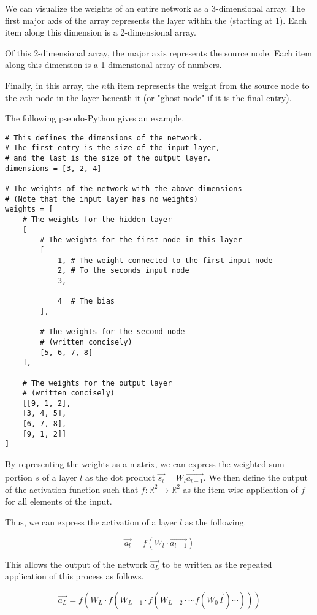 \documentclass[8pt]{amsart}
\begin{document}
We can visualize the weights of an entire network as a 3-dimensional array. The first
major axis of the array represents the layer within the  (starting at 1). Each item
along this dimension is a 2-dimensional array.

Of this 2-dimensional array, the major axis represents the source node. Each item
along this dimension is a 1-dimensional array of numbers.

Finally, in this array, the $n$th item represents the weight from the source node
to the $n$th node in the layer beneath it (or "ghost node" if it is the final entry).

The following pseudo-Python gives an example.

\begin{verbatim}
# This defines the dimensions of the network.
# The first entry is the size of the input layer,
# and the last is the size of the output layer.
dimensions = [3, 2, 4]

# The weights of the network with the above dimensions
# (Note that the input layer has no weights)
weights = [
    # The weights for the hidden layer
    [
        # The weights for the first node in this layer
        [
            1, # The weight connected to the first input node
            2, # To the seconds input node
            3,
            
            4  # The bias
        ],

        # The weights for the second node
        # (written concisely)
        [5, 6, 7, 8]
    ],

    # The weights for the output layer
    # (written concisely)
    [[9, 1, 2],
    [3, 4, 5],
    [6, 7, 8],
    [9, 1, 2]]
]
\end{verbatim}

By representing the weights as a matrix, we can express the weighted sum portion $s$
of a layer $l$ as the dot product $\vec{s_l} = W_l \dot \vec{a_{l - 1}}$. We then
define the output of the activation function such that
$f: \mathbb{R}^2 \to \mathbb{R}^2$ as the item-wise application of $f$ for
all elements of the input.

Thus, we can express the activation of a layer $l$ as the following.

\[
    \vec{a_l} = f(W_l \cdot \vec{a_{l - 1}})
\]

This allows the output of the network $\vec{a_L}$ to be written as the repeated
application of this process as follows.

\[
    \vec{a_L} = f \left( 
        W_L \cdot f \left(
            W_{L - 1} \cdot f \left( 
                W_{L - 2} \cdot \cdots
                    f \left( W_0 \vec{I}
                \right) \cdots 
            \right)
        \right)
    \right)
\]
\end{document}
